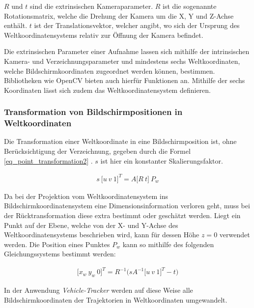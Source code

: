 $R$ und $t$ sind die extrinsischen Kameraparameter. $R$ ist die sogenannte Rotationsmatrix, welche
die Drehung der Kamera um die X, Y und Z-Achse enthält. $t$ ist der Translationsvektor,
welcher angibt, wo sich der Ursprung des Weltkoordinatensystems relativ zur Öffnung der Kamera befindet. \cite[]{Jahne2012}

Die extrinsischen Parameter einer Aufnahme lassen sich mithilfe der intrinsischen Kamera- und Verzeichnungsparameter
und mindestens sechs Weltkoordinaten, welche Bildschirmkoordinaten zugeordnet werden können, bestimmen. Bibliotheken
wie OpenCV bieten auch hierfür Funktionen an. Mithilfe der sechs Koordinaten lässt sich zudem das Weltkoordinatensystem
definieren.

\subsubsection{Transformation von Bildschirmpositionen in Weltkoordinaten}

Die Transformation einer Weltkoordinate in eine Bildschirmposition ist, ohne Berücksichtigung der Verzeichnung,
gegeben durch die Formel \ref{eq_point_transformation2} \cite[]{DevTeamOpenCV2018}. $s$ ist hier ein konstanter Skalierungsfaktor.

\begin{ceqn}
\begin{align}
\label{eq_point_transformation2}
    s\ \big[u\ v\ 1\big]^T = A \big[R\ t\big]\ P_w
\end{align}
\end{ceqn}

Da bei der Projektion vom Weltkoordinatensystem ins Bildschirmkoordinatensystem eine Dimensionsinformation
verloren geht, muss bei der Rücktransformation diese extra bestimmt oder geschätzt werden. Liegt ein Punkt
auf der Ebene, welche von der X- und Y-Achse des Weltkoordinatensystems beschrieben wird, kann für dessen
Höhe $z = 0$ verwendet werden.
Die Position eines Punktes $P_w$ kann so mithilfe des folgenden Gleichungssystems bestimmt werden:

\begin{ceqn}
\begin{align}
\label{eq_point_transformation3}
    \big[x_w\ y_w\ 0\big]^T = R^{-1}\Big(sA^{-1} \big[u\ v\ 1\big]^T - t\Big)
\end{align}
\end{ceqn}

In der Anwendung \textit{Vehicle-Tracker} werden auf diese Weise alle Bildschirmkoordinaten der Trajektorien
in Weltkoordinaten umgewandelt.

